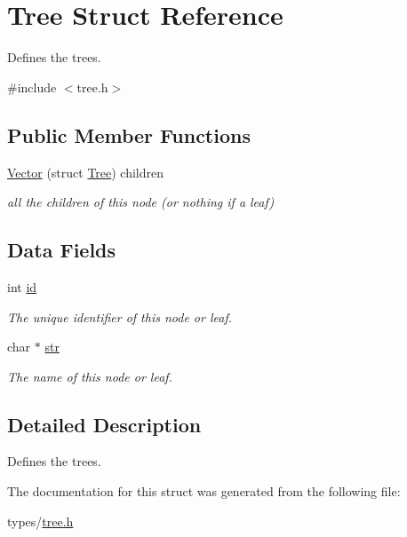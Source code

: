 \hypertarget{struct_tree}{}\section{Tree Struct Reference}
\label{struct_tree}


Defines the trees.  




{\ttfamily \#include $<$tree.\+h$>$}

\subsection*{Public Member Functions}
\begin{DoxyCompactItemize}
\item 
\hyperlink{struct_tree_ab66a14a08679ea9ed3a7c01123e379e6}{Vector} (struct \hyperlink{struct_tree}{Tree}) children\hypertarget{struct_tree_ab66a14a08679ea9ed3a7c01123e379e6}{}\label{struct_tree_ab66a14a08679ea9ed3a7c01123e379e6}

\begin{DoxyCompactList}\small\item\em all the children of this node (or nothing if a leaf) \end{DoxyCompactList}\end{DoxyCompactItemize}
\subsection*{Data Fields}
\begin{DoxyCompactItemize}
\item 
int \hyperlink{struct_tree_a7441ef0865bcb3db9b8064dd7375c1ea}{id}\hypertarget{struct_tree_a7441ef0865bcb3db9b8064dd7375c1ea}{}\label{struct_tree_a7441ef0865bcb3db9b8064dd7375c1ea}

\begin{DoxyCompactList}\small\item\em The unique identifier of this node or leaf. \end{DoxyCompactList}\item 
char $\ast$ \hyperlink{struct_tree_ab50d783982593ef993ea0b68f7ad8b80}{str}\hypertarget{struct_tree_ab50d783982593ef993ea0b68f7ad8b80}{}\label{struct_tree_ab50d783982593ef993ea0b68f7ad8b80}

\begin{DoxyCompactList}\small\item\em The name of this node or leaf. \end{DoxyCompactList}\end{DoxyCompactItemize}


\subsection{Detailed Description}
Defines the trees. 

The documentation for this struct was generated from the following file\+:\begin{DoxyCompactItemize}
\item 
types/\hyperlink{tree_8h}{tree.\+h}\end{DoxyCompactItemize}
